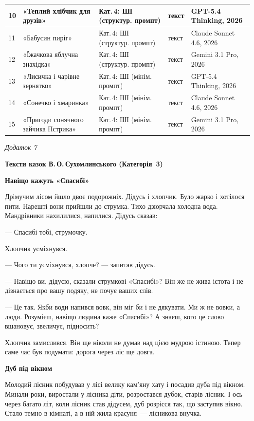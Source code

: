 \documentclass[14pt, a4paper]{extreport}
\begin{document}
\begin{longtable}{|p{0.5cm}|p{3.8cm}|p{3.2cm}|p{2.0cm}|p{4.5cm}|}
\hline
10 & «Теплий хлібчик для друзів» & Кат.\,4: ШІ (структур. промпт) & текст & GPT-5.4 Thinking, 2026 \\
\hline
11 & «Бабусин пиріг» & Кат.\,4: ШІ (структур. промпт) & текст & Claude Sonnet 4.6, 2026 \\
\hline
12 & «Їжачкова яблучна знахідка» & Кат.\,4: ШІ (структур. промпт) & текст & Gemini 3.1 Pro, 2026 \\
\hline
13 & «Лисичка і чарівне зернятко» & Кат.\,4: ШІ (мінім. промпт) & текст & GPT-5.4 Thinking, 2026 \\
\hline
14 & «Сонечко і хмаринка» & Кат.\,4: ШІ (мінім. промпт) & текст & Claude Sonnet 4.6, 2026 \\
\hline
15 & «Пригоди сонячного зайчика Пстрика» & Кат.\,4: ШІ (мінім. промпт) & текст & Gemini 3.1 Pro, 2026 \\
\hline
\end{longtable}
\endgroup

\newpage
\begin{flushright}\textit{Додаток 7}\end{flushright}
\begin{center}\textbf{Тексти казок В.\,О.\,Сухомлинського (Категорія~3)}\end{center}
\vspace{0.3cm}

\textbf{Навіщо кажуть «Спасибі»}

Дрімучим лісом йшло двоє подорожніх. Дідусь і хлопчик. Було жарко і хотілося пити. Нарешті вони прийшли до струмка. Тихо дзюрчала холодна вода. Мандрівники нахилилися, напилися. Дідусь сказав:

--- Спасибі тобі, струмочку.

Хлопчик усміхнувся.

--- Чого ти усміхнувся, хлопче? --- запитав дідусь.

--- Навіщо ви, дідусю, сказали струмкові «Спасибі»? Він же не жива істота і не дізнається про вашу подяку, не почує ваших слів.

--- Це так. Якби води напився вовк, він міг би і не дякувати. Ми ж не вовки, а люди. Розумієш, навіщо людина каже «Спасибі»? А знаєш, кого це слово вшановує, звеличує, підносить?

Хлопчик замислився. Він ще ніколи не думав над цією мудрою істиною. Тепер саме час був подумати: дорога через ліс ще довга.

\vspace{14pt}
\textbf{Дуб під вікном}

Молодий лісник побудував у лісі велику кам'яну хату і посадив дуба під вікном. Минали роки, виростали у лісника діти, розростався дубок, старів лісник. І ось через багато літ, коли лісник став дідусем, дуб розрісся так, що заступив вікно. Стало темно в кімнаті, а в ній жила красуня~--- лісникова внучка.
\end{document}
